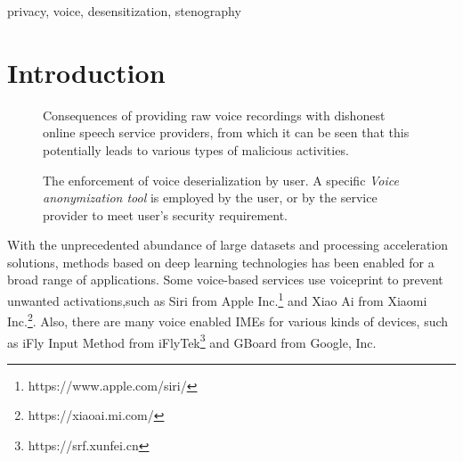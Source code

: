 \documentclass[journal]{IEEEtran} %
\begin{document}
\begin{IEEEkeywords}
    privacy, voice, desensitization, stenography
\end{IEEEkeywords}

\section{Introduction}
\label{seg:intro}

\begin{figure}[!t]
    \caption{Consequences of providing raw voice recordings with dishonest online speech service providers, from which it can be seen that this potentially leads to various types of malicious activities.}
    \label{fig:dishonest_provider}
\end{figure}

\begin{figure}[!t]
    \caption{The enforcement of voice deserialization by user. A specific \textit{Voice anonymization tool} is employed by the user, or by the service provider to meet user's security requirement.}
    \label{fig:privacy_enforcement}
\end{figure}

With the unprecedented abundance of large datasets and processing acceleration solutions, methods based on deep learning technologies has been enabled for a broad range of applications. Some voice-based services use voiceprint to prevent unwanted activations,such as Siri from Apple Inc.\footnote{https://www.apple.com/siri/} and Xiao Ai from Xiaomi Inc.\footnote{https://xiaoai.mi.com/}. Also, there are many voice enabled IMEs for various kinds of devices, such as iFly Input Method from iFlyTek\footnote{https://srf.xunfei.cn} and GBoard from Google, Inc.
\end{document}
